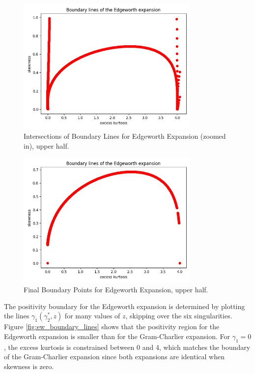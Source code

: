 \begin{figure}[h]
    \centering
    \includegraphics[width=0.8\textwidth]{img/edgeworth_positivity_boundary_intersections_4.png}
    \caption{Intersections of Boundary Lines for Edgeworth Expansion (zoomed in), upper half.}
    \label{fig:ew_boundary_intersections_4}
\end{figure}
\begin{figure}[h]
    \centering
    \includegraphics[width=0.8\textwidth]{img/edgeworth_positivity_boundary_intersections_7.png}
    \caption{Final Boundary Points for Edgeworth Expansion, upper half.}
    \label{fig:ew_boundary_intersections_7}
\end{figure}

The positivity boundary for the Edgeworth expansion is determined by plotting the lines $\gamma_1(\gamma_2^*, z)$ for many values of $z$, skipping over the six singularities. Figure \ref{fig:ew_boundary_lines} shows that the positivity region for the Edgeworth expansion is smaller than for the Gram-Charlier expansion. For $\gamma_1 = 0$, the excess kurtosis is constrained between 0 and 4, which matches the boundary of the Gram-Charlier expansion since both expansions are identical when skewness is zero.

